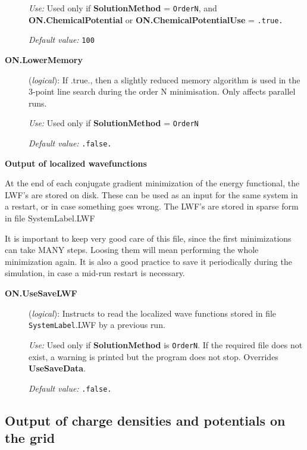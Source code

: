 \documentclass[11pt]{article}
\begin{document}
\begin{description}
{\it Use:} Used only if {\bf SolutionMethod} = {\tt OrderN},
and {\bf ON.ChemicalPotential} or  {\bf ON.ChemicalPotentialUse} = 
{\tt .true.}

{\it Default value:} {\tt 100}

\item[{\bf ON.LowerMemory}] ({\it logical}): 
If .true., then a slightly reduced memory algorithm is used in the 
3-point line search during the order N minimisation. Only affects
parallel runs.

{\it Use:} Used only if  {\bf SolutionMethod} = {\tt OrderN}

{\it Default value:} {\tt .false.}

        
\end{description}

{\bf Output of localized wavefunctions}

At the end of each conjugate gradient minimization of the energy
functional, the LWF's are stored on disk. These can be used as an
input for the same system in a restart, or in case something goes
wrong.  The LWF's are stored in sparse form in file SystemLabel.LWF

It is important to keep very good care of this file, since the first
minimizations can take MANY steps. Loosing them will mean performing
the whole minimization again. It is also a good practice to save it
periodically during the simulation, in case a mid-run restart is
necessary.

\begin{description}

\item[{\bf ON.UseSaveLWF}] ({\it logical}): 
Instructs to read the localized wave functions stored in file
{\tt SystemLabel}.LWF by a previous run.

{\it Use:} Used only if {\bf SolutionMethod} is {\tt OrderN}.
If the required file does not exist, a warning is
printed but the program does not stop. Overrides {\bf UseSaveData}.

{\it Default value:} {\tt .false.}

\end{description}

\vspace{5pt}
\subsection{Output of charge densities and potentials on the grid}
\end{document}
